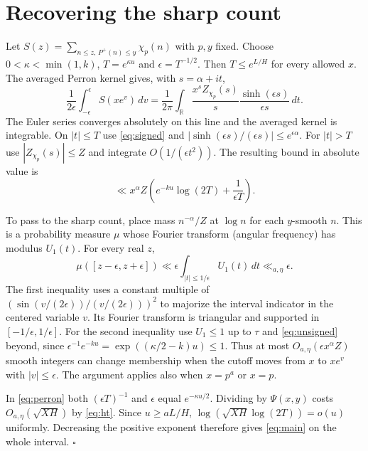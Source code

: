 \documentclass[11pt]{article}
\newcommand{\ch}{\chi_p}
\begin{document}
\section{Recovering the sharp count}
Let \(S(z)=\sum_{n\le z,\,P^+(n)\le y}\ch(n)\) with \(p,y\) fixed.
Choose \(0<\kappa<\min(1,k)\), \(T=e^{\kappa u}\) and
\(\epsilon=T^{-1/2}\). Then \(T\le e^{L/H}\) for every allowed \(x\).
The averaged Perron kernel gives, with \(s=\alpha+it\),
\[
 \frac1{2\epsilon}\int_{-\epsilon}^{\epsilon}S(xe^v)\,dv
 =\frac1{2\pi}\int_{\mathbb R}
       \frac{x^s Z_{\ch}(s)}s
       \frac{\sinh(\epsilon s)}{\epsilon s}\,dt .
\]
The Euler series converges absolutely on this line and the averaged
kernel is integrable. On \(|t|\le T\) use \eqref{eq:signed} and
\(|\sinh(\epsilon s)/(\epsilon s)|\le e^{\epsilon\alpha}\).
For \(|t|>T\) use \(|Z_{\ch}(s)|\le Z\) and integrate
\(O(1/(\epsilon t^2))\). The resulting bound in absolute value is
\begin{equation}\label{eq:perron}
 \ll x^\alpha Z\left(e^{-ku}\log(2T)+\frac1{\epsilon T}\right).
\end{equation}

To pass to the sharp count, place mass \(n^{-\alpha}/Z\) at \(\log n\)
for each \(y\)-smooth \(n\). This is a probability measure \(\mu\)
whose Fourier transform (angular frequency) has modulus \(U_1(t)\).
For every real \(z\),
\[
 \mu([z-\epsilon,z+\epsilon])
 \ll \epsilon\int_{|t|\le1/\epsilon}U_1(t)\,dt
 \ll_{a,\eta}\epsilon .
\]
The first inequality uses a constant multiple of
\((\sin(v/(2\epsilon))/(v/(2\epsilon)))^2\) to majorize the interval
indicator in the centered variable \(v\). Its Fourier transform is
triangular and supported in \([-1/\epsilon,1/\epsilon]\). For the
second inequality use \(U_1\le1\) up to \(\tau\) and
\eqref{eq:unsigned} beyond, since
\(\epsilon^{-1}e^{-ku}=\exp((\kappa/2-k)u)\le1\).
Thus at most \(O_{a,\eta}(\epsilon x^\alpha Z)\) smooth integers can
change membership when the cutoff moves from \(x\) to \(xe^v\) with
\(|v|\le\epsilon\). The argument applies also when \(x=p^a\) or \(x=p\).

In \eqref{eq:perron} both \((\epsilon T)^{-1}\) and \(\epsilon\)
equal \(e^{-\kappa u/2}\). Dividing by \(\Psi(x,y)\) costs
\(O_{a,\eta}(\sqrt{XH})\) by \eqref{eq:ht}. Since \(u\ge aL/H\),
\(\log(\sqrt{XH}\log(2T))=o(u)\) uniformly. Decreasing the positive
exponent therefore gives \eqref{eq:main} on the whole interval.
\hfill\(\square\)
\end{document}

